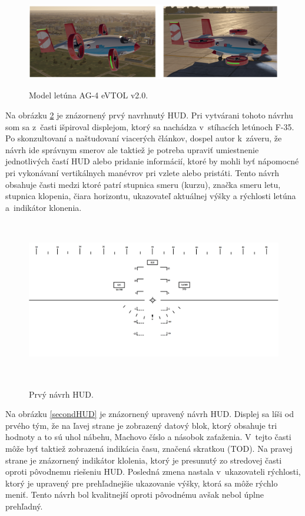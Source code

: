 \begin{figure}[ht]
\centering
\includegraphics[scale=0.4]{obrazky-figures/eVTOL_aircraft.png}
\caption{Model letúna AG-4 eVTOL v2.0.}{\label{evtol}}
\end{figure}

Na obrázku \ref{vlastny_navrh} je znázornený prvý navrhnutý HUD. Pri vytvárani tohoto návrhu som sa z~časti išpiroval displejom, ktorý sa nachádza v~stíhacích letúnoch F-35. Po skonzultovaní a naštudovaní viacerých článkov, dospel autor k~záveru, že návrh ide správnym smerov ale taktiež je potreba upraviť umiestnenie jednotlivých častí HUD alebo pridanie informácií, ktoré by mohli byť nápomocné pri vykonávaní vertikálnych manévrov pri vzlete alebo pristáti. Tento návrh obsahuje časti medzi ktoré patrí stupnica smeru (kurzu), značka smeru letu, stupnica klopenia, čiara horizontu, ukazovateľ aktuálnej výšky a rýchlosti letúna a~indikátor klonenia.
\newpage
\begin{figure}[ht]
\centering
\includegraphics[height=7cm, width=14cm]{obrazky-figures/HUD_navrh2.png}
\caption{Prvý návrh HUD.}{\label{vlastny_navrh}}
\end{figure}

Na obrázku \ref{secondHUD} je znázornený upravený návrh HUD. Displej sa líši od prvého tým, že na ľavej strane je zobrazený datový blok, ktorý obsahuje tri hodnoty a to sú uhol nábehu, Machovo číslo a násobok zaťaženia. V~tejto časti môže byť taktiež zobrazená indikácia času, značená skratkou (TOD). Na pravej strane je znázornený indikátor klolenia, ktorý je presunutý zo stredovej časti oproti pôvodnemu riešeniu HUD. Posledná zmena nastala v~ukazovateli rýchlosti, ktorý je upravený pre prehľadnejšie ukazovanie výšky, ktorá sa môže rýchlo meniť. Tento návrh bol kvalitnejší oproti pôvodnému avšak nebol úplne prehľadný.

